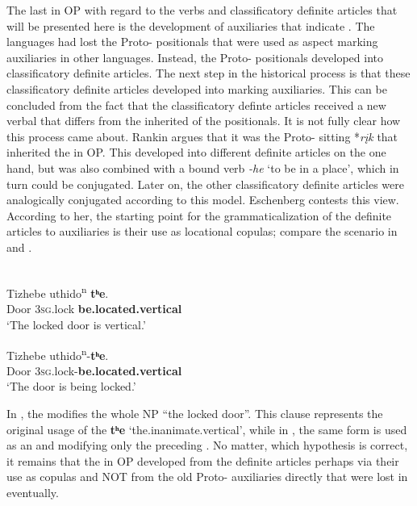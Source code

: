 \documentclass[output=paper]{langsci/langscibook}
\begin{document}
The last  in OP with regard to the  verbs and classificatory definite articles that will be presented here is the development of auxiliaries that indicate . The  languages had lost the Proto- positionals that were used as aspect marking auxiliaries in other  languages. Instead, the Proto- positionals developed into classificatory definite articles. The next step in the historical process is that these classificatory definite articles developed into  marking auxiliaries. This can be concluded from the fact that the classificatory definte articles received a new verbal  that differs from the inherited  of the positionals. 
It is not fully clear how this process came about. Rankin argues that it was the Proto- sitting  *\textit{r\k{i}k} that inherited the  in OP. This  developed into different definite articles on the one hand, but was also combined with a bound verb \textit{-he} `to be in a place', which in turn could be conjugated. Later on, the other classificatory definite articles were analogically conjugated according to this model. 
Eschenberg contests this view. According to her, the starting point for the grammaticalization of the definite articles to  auxiliaries is their use as locational copulas; compare the scenario in  and .

\ea \label{ex:helmbrecht:24}
 \citep[190]{Eschenberg2005}\\
\gll {\ob}{\ob}Tizhebe uthido\textsuperscript{n}{\cb}   \textbf{tʰe}{\cb}.\\
      Door      \textsc{3sg}.lock \textbf{be.located.vertical}\\
\glt   `The locked door is vertical.’
\z

\ea \label{ex:helmbrecht:25}
\gll {\ob}{\ob}Tizhebe{\cb} {\ob}uthido\textsuperscript{n}-\textbf{tʰe}{\cb}{\cb}.\\
       Door        \textsc{3sg}.lock-\textbf{be.located.vertical}\\
\glt    `The door is being locked.’
\z
    
In , the  modifies the whole NP ``the locked door''. This clause represents the original usage of the  \textbf{{t}}\textbf{{ʰ}}\textbf{{e}} `the.inanimate.vertical', while in , the same form is used as an  and modifying only the preceding . 
No matter, which hypothesis is correct, it remains that the   in OP developed from the definite articles perhaps via their use as copulas and NOT from the old Proto-  auxiliaries directly that were lost in  eventually. 
\end{document}
